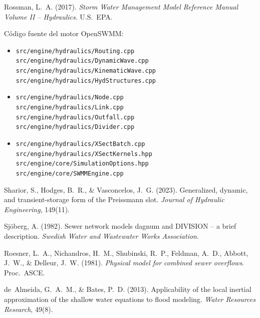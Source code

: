 \documentclass[11pt,a4paper]{article}
\newcommand{\src}[1]{\texttt{src/engine/#1}}
\begin{document}
\begin{enumerate}[nosep,label={[\arabic*]}]
  \item Rossman, L.~A. (2017). \emph{Storm Water Management Model Reference
        Manual Volume II -- Hydraulics}. U.S.\ EPA.
  \item Código fuente del motor OpenSWMM:
        \begin{itemize}[nosep,itemsep=0pt]
          \item \src{hydraulics/Routing.cpp} \\
                \src{hydraulics/DynamicWave.cpp} \\
                \src{hydraulics/KinematicWave.cpp} \\
                \src{hydraulics/HydStructures.cpp}
          \item \src{hydraulics/Node.cpp} \\
                \src{hydraulics/Link.cpp} \\
                \src{hydraulics/Outfall.cpp} \\
                \src{hydraulics/Divider.cpp}
          \item \src{hydraulics/XSectBatch.cpp} \\
                \src{hydraulics/XSectKernels.hpp} \\
                \src{core/SimulationOptions.hpp} \\
                \src{core/SWMMEngine.cpp}
        \end{itemize}
  \item Sharior, S., Hodges, B.~R., \& Vasconcelos, J.~G. (2023).
        Generalized, dynamic, and transient-storage form of the Preissmann
        slot. \emph{Journal of Hydraulic Engineering}, 149(11).
  \item Sj{\"o}berg, A. (1982). Sewer network models dagnum and DIVISION --
        a brief description. \emph{Swedish Water and Wastewater Works
        Association}.
  \item Roesner, L.~A., Nichandros, H.~M., Shubinski, R.~P., Feldman, A.~D.,
        Abbott, J.~W., \& Delleur, J.~W. (1981). \emph{Physical model for
        combined sewer overflows}. Proc.\ ASCE.
  \item de~Almeida, G.~A.~M., \& Bates, P.~D. (2013). Applicability of the
        local inertial approximation of the shallow water equations to flood
        modeling. \emph{Water Resources Research}, 49(8).
\end{enumerate}
\end{document}
